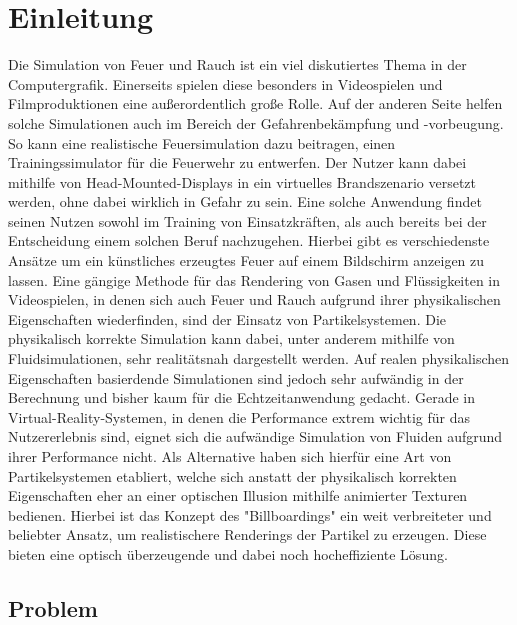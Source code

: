 \section{Einleitung}
\noindent
Die Simulation von Feuer und Rauch ist ein viel diskutiertes Thema in der Computergrafik. Einerseits
spielen diese besonders in Videospielen und Filmproduktionen eine außerordentlich große Rolle. Auf der 
anderen Seite helfen solche Simulationen auch im Bereich der Gefahrenbekämpfung und -vorbeugung.
So kann eine realistische Feuersimulation dazu beitragen, einen Trainingssimulator für die Feuerwehr zu 
entwerfen. Der Nutzer kann dabei mithilfe von Head-Mounted-Displays in ein virtuelles Brandszenario versetzt werden, 
ohne dabei wirklich in Gefahr zu sein. Eine solche Anwendung findet seinen Nutzen sowohl im Training 
von Einsatzkräften, als auch bereits bei der Entscheidung einem solchen Beruf nachzugehen. 
Hierbei gibt es verschiedenste Ansätze um ein künstliches erzeugtes Feuer auf einem 
Bildschirm anzeigen zu lassen. Eine gängige Methode für das Rendering von Gasen und Flüssigkeiten 
in Videospielen, in denen sich auch Feuer und Rauch aufgrund ihrer physikalischen Eigenschaften 
wiederfinden, sind der Einsatz von Partikelsystemen. Die physikalisch korrekte Simulation kann dabei, 
unter anderem mithilfe von Fluidsimulationen, sehr realitätsnah dargestellt werden.
Auf realen physikalischen Eigenschaften basierdende Simulationen sind jedoch sehr aufwändig in der 
Berechnung und bisher kaum für die Echtzeitanwendung gedacht.
Gerade in Virtual-Reality-Systemen, in denen die Performance extrem wichtig für das Nutzererlebnis sind,
eignet sich die aufwändige Simulation von Fluiden aufgrund ihrer Performance nicht. Als Alternative haben 
sich hierfür eine Art von Partikelsystemen etabliert, welche sich anstatt der physikalisch korrekten 
Eigenschaften eher an einer optischen Illusion mithilfe animierter Texturen bedienen. 
Hierbei ist das Konzept des "Billboardings" ein weit verbreiteter und beliebter Ansatz, 
um realistischere Renderings der Partikel zu erzeugen. Diese bieten eine optisch überzeugende und 
dabei noch hocheffiziente Lösung.



\subsection{Problem}


